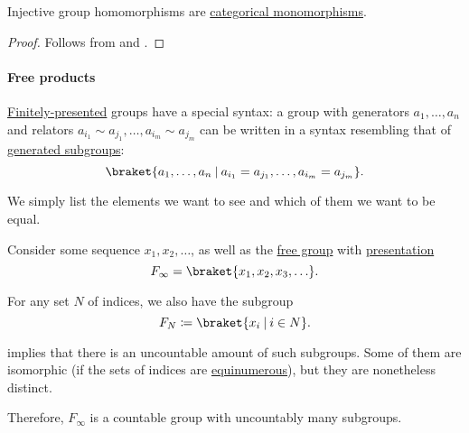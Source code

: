 \begin{corollary}\label{thm:injective_group_homomorphisms_are_monomorphisms}
  Injective group homomorphisms are \hyperref[def:morphism_invertibility/left_cancellative]{categorical monomorphisms}.
\end{corollary}
\begin{proof}
  Follows from  and .
\end{proof}

\paragraph{Free products}

\begin{remark}\label{rem:group_presentation_syntax}
  \hyperref[def:object_presentation/cardinality]{Finitely-presented} groups have a special syntax: a group with generators \( a_1, \ldots, a_n \) and relators \( a_{i_1} \sim a_{j_1}, \ldots, a_{i_m} \sim a_{j_m} \) can be written in a syntax resembling that of \hyperref[def:group/generated]{generated subgroups}:
  \begin{equation*}
    \braket{ a_1, \ldots, a_n \given a_{i_1} = a_{j_1}, \ldots, a_{i_m} = a_{j_m} }.
  \end{equation*}

  We simply list the elements we want to see and which of them we want to be equal.
\end{remark}

\begin{example}\label{ex:free_group_with_uncountably_many_subgroups}
  Consider some sequence \( x_1, x_2, \ldots \), as well as the \hyperref[def:free_group]{free group} with \hyperref[rem:group_presentation_syntax]{presentation}
  \begin{equation*}
    F_\infty = \braket{ x_1, x_2, x_3, \ldots }.
  \end{equation*}

  For any set \( N \) of indices, we also have the subgroup
  \begin{equation*}
    F_N \coloneqq \braket{ x_i \given i \in N }.
  \end{equation*}

   implies that there is an uncountable amount of such subgroups. Some of them are isomorphic (if the sets of indices are \hyperref[def:equinumerosity]{equinumerous}), but they are nonetheless distinct.

  Therefore, \( F_\infty \) is a countable group with uncountably many subgroups.
\end{example}

